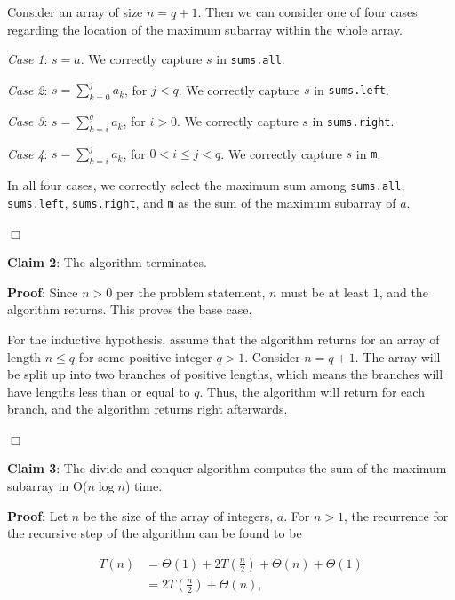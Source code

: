 \documentclass[a4paper,10pt]{article}
\begin{document}
		Consider an array of size $n=q+1$. Then we can consider one of four cases regarding the location of the maximum subarray within the whole array.

		{\it Case 1}: $\displaystyle s = a$. We correctly capture $s$ in {\tt sums.all}.

		{\it Case 2}: $\displaystyle s = \sum_{k=0}^j a_k$, for $j < q$. We correctly capture $s$ in {\tt sums.left}.

		{\it Case 3}: $\displaystyle s = \sum_{k=i}^q a_k$, for $i > 0$. We correctly capture $s$ in {\tt sums.right}.

		{\it Case 4}: $\displaystyle s = \sum_{k=i}^j a_k$, for $0 < i \leq j < q$. We correctly capture $s$ in {\tt m}.

		In all four cases, we correctly select the maximum sum among {\tt sums.all}, {\tt sums.left}, {\tt sums.right}, and {\tt m} as the sum of the maximum subarray of $a$.

		\begin{center}
		$\Box$
		\end{center}

		
		{\bf Claim 2}: The algorithm terminates.

		{\bf Proof}: Since $n>0$ per the problem statement, $n$ must be at least $1$, and the algorithm returns. This proves the base case.

		For the inductive hypothesis, assume that the algorithm returns for an array of length $n \leq q$ for some positive integer $q>1$. Consider $n=q+1$. The array will be split up into two branches of positive lengths, which means the branches will have lengths less than or equal to $q$. Thus, the algorithm will return for each branch, and the algorithm returns right afterwards.

		\begin{center}
		$\Box$
		\end{center}


		{\bf Claim 3}: The divide-and-conquer algorithm computes the sum of the maximum subarray in O($n \log n$) time.

		{\bf Proof}: Let $n$ be the size of the array of integers, $a$. For $n>1$, the recurrence for the recursive step of the algorithm can be found to be

		\begin{align*}
		T(n) &= \Theta(1) + 2T\left(\frac{n}{2}\right) + \Theta(n) + \Theta(1) \\
		     &= 2T\left(\frac{n}{2}\right) + \Theta(n),
		\end{align*}
\end{document}
